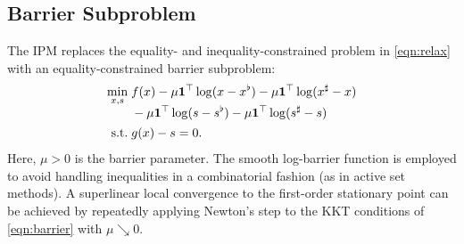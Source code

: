 \documentclass{IEEEtran4PSCC} %
\newcommand{\st}{\mathop{\text{\normalfont s.t.}}}
\begin{document}
\subsection{Barrier Subproblem}

The IPM replaces the equality- and inequality-constrained problem in \eqref{eqn:relax} with an equality-constrained  barrier subproblem:
\begin{subequations}\label{eqn:barrier}
  \begin{align}
    \min_{x, s}\;
    &
      \begin{aligned}[t]
        &f(x) - \mu\boldsymbol{1}^\top \log (x- x^\flat) -\mu\boldsymbol{1}^\top \log (x^\sharp -x)\\
        &- \mu\boldsymbol{1}^\top \log (s- s^\flat) -\mu\boldsymbol{1}^\top \log (s^\sharp -s)
      \end{aligned}
          \label{eqn:barrier-obj}\\
    \st\;
    &g(x) - s = 0. \label{eqn:barrier-con}
  \end{align}
\end{subequations}
Here, $\mu>0$ is the barrier parameter. The smooth log-barrier
function is employed to avoid handling inequalities in a combinatorial
fashion (as in active set methods). A superlinear local convergence to
the first-order stationary point can be achieved by repeatedly
applying Newton's step to the KKT conditions of \eqref{eqn:barrier}
with $\mu\searrow 0 $.
\end{document}
